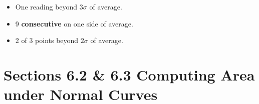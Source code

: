 \documentclass{article}
\begin{document}
\begin{enumerate}
\begin{itemize}
                    \begin{itemize}
                    
                        \item One reading beyond $3\sigma$ of average.
                        
                        \item 9 \textbf{consecutive} on one side of average.
                        
                        \item 2 of 3 points beyond $2\sigma$ of average.
                        
                    \end{itemize}
                    
            \end{itemize}
            
    \end{enumerate}

\newpage

\section*{Sections 6.2 \& 6.3 Computing Area under Normal Curves}
\end{document}
